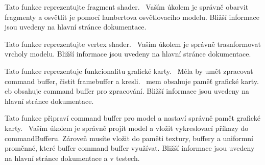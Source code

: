 
\begin{DoxyRefList}
\item[Global \mbox{\hyperlink{prepareModel_8hpp_a4fb632ea1b28681c59ef705725611573}{draw\+Model\+\_\+fragment\+Shader}} (\mbox{\hyperlink{structOutFragment}{Out\+Fragment}} \&out\+Fragment, \mbox{\hyperlink{structInFragment}{In\+Fragment}} const \&in\+Fragment, \mbox{\hyperlink{structShaderInterface}{Shader\+Interface}} const \&si)]\label{todo__todo000004}%
%
Tato funkce reprezentujte fragment shader.~\newline
 Vaším úkolem je správně obarvit fragmenty a osvětlit je pomocí lambertova osvětlovacího modelu. Bližší informace jsou uvedeny na hlavní stránce dokumentace.  
\item[Global \mbox{\hyperlink{prepareModel_8hpp_a0224939bb488063ed7ba3a75659e4616}{draw\+Model\+\_\+vertex\+Shader}} (\mbox{\hyperlink{structOutVertex}{Out\+Vertex}} \&out\+Vertex, \mbox{\hyperlink{structInVertex}{In\+Vertex}} const \&in\+Vertex, \mbox{\hyperlink{structShaderInterface}{Shader\+Interface}} const \&si)]\label{todo__todo000003}%
%
Tato funkce reprezentujte vertex shader.~\newline
 Vaším úkolem je správně trasnformovat vrcholy modelu. Bližší informace jsou uvedeny na hlavní stránce dokumentace.  
\item[Global \mbox{\hyperlink{gpu_8hpp_a534f9ebe20a4f57bd73b4dfb9bb4b29b}{izg\+\_\+enqueue}} (\mbox{\hyperlink{structGPUMemory}{G\+P\+U\+Memory}} \&mem, \mbox{\hyperlink{structCommandBuffer}{Command\+Buffer}} const \&cb)]\label{todo__todo000001}%
%
Tato funkce reprezentuje funkcionalitu grafické karty.~\newline
 Měla by umět zpracovat command buffer, čistit framebuffer a kresli.~\newline
 mem obsahuje paměť grafické karty. cb obsahuje command buffer pro zpracování. Bližší informace jsou uvedeny na hlavní stránce dokumentace.  
\item[Global \mbox{\hyperlink{prepareModel_8hpp_af46f2952d390459f20fc55a1eb8f4f30}{prepare\+Model}} (\mbox{\hyperlink{structGPUMemory}{G\+P\+U\+Memory}} \&mem, \mbox{\hyperlink{structCommandBuffer}{Command\+Buffer}} \&command\+Buffer, \mbox{\hyperlink{structModel}{Model}} const \&model)]\label{todo__todo000002}%
%
Tato funkce připraví command buffer pro model a nastaví správně pamět grafické karty.~\newline
 Vaším úkolem je správně projít model a vložit vykreslovací příkazy do command\+Bufferu. Zároveň musíte vložit do paměti textury, buffery a uniformní proměnné, které buffer command buffer využívat. Bližší informace jsou uvedeny na hlavní stránce dokumentace a v testech. 
\end{DoxyRefList}